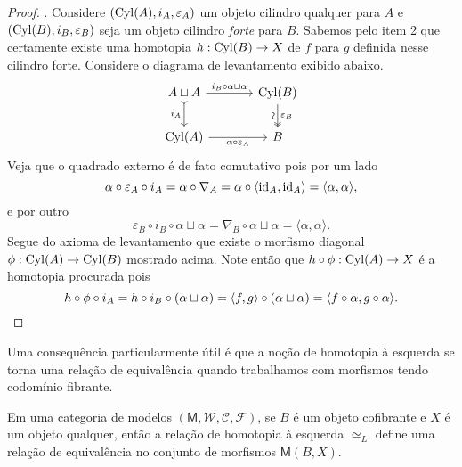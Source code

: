 \begin{proof}
  . Considere $(\mathrm{Cyl}(A),i_{A},\varepsilon_{A})$ um objeto cilindro qualquer para $A$ e $(\mathrm{Cyl}(B),i_{B},\varepsilon_{B})$ seja um objeto cilindro \emph{forte} para $B$.
  Sabemos pelo item 2 que certamente existe uma homotopia $h: \mathrm{Cyl}(B) \to X$ de $f$ para $g$ definida nesse cilindro forte.
  Considere o diagrama de levantamento exibido abaixo.
  \begin{displaymath}
    \begin{tikzcd}[column sep=1.25cm]
      A \sqcup A
      \arrow[r, "{i_{B} \circ \alpha \sqcup \alpha}"]
      \arrow[d, tail, "i_{A}" swap]
      & \Cyl(B)
      \arrow[d, two heads, "\varepsilon_{B}", "\sim" {swap,sloped}]
      \\ \Cyl(A)
      \arrow[r, "\alpha \circ \varepsilon_{A}" swap]
      & B
    \end{tikzcd}
  \end{displaymath}
  Veja que o quadrado externo é de fato comutativo pois por um lado
  \begin{displaymath}
    \alpha \circ \varepsilon_{A} \circ i_{A} = \alpha \circ \nabla_{A} = \alpha \circ \langle \mathrm{id}_{A},\mathrm{id}_{A} \rangle = \langle \alpha,\alpha \rangle,
  \end{displaymath}
  e por outro
  \begin{displaymath}
    \varepsilon_{B} \circ i_{B} \circ \alpha \sqcup \alpha = \nabla_{B} \circ \alpha \sqcup \alpha = \langle \alpha,\alpha \rangle.
  \end{displaymath}
  Segue do axioma de levantamento que existe o morfismo diagonal $\phi: \mathrm{Cyl}(A) \to \mathrm{Cyl}(B)$ mostrado acima.
  Note então que $h \circ \phi: \mathrm{Cyl}(A) \to X$ é a homotopia procurada pois
  \begin{displaymath}
    h \circ \phi \circ i_{A} = h \circ i_{B} \circ (\alpha \sqcup \alpha) = \langle f,g \rangle \circ (\alpha \sqcup \alpha) = \langle f \circ \alpha, g \circ \alpha \rangle. \qedhere
  \end{displaymath}
\end{proof}

Uma consequência particularmente útil é que a noção de homotopia à esquerda se torna uma relação de equivalência quando trabalhamos com morfismos tendo codomínio fibrante.

\begin{corol}\label{corol:homotopia_esquerda_rel_equiv_se_dom_cofib}
  Em uma categoria de modelos $(\mathsf{M},\mathcal{W},\mathcal{C},\mathcal{F})$, se $B$ é um objeto cofibrante e $X$ é um objeto qualquer, então a relação de homotopia à esquerda $\simeq_{L}$ define uma relação de equivalência no conjunto de morfismos $\mathsf{M}(B,X)$.
\end{corol}

